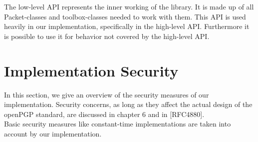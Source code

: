 The low-level API represents the inner working of the library. It is made up of all Packet-classes and toolbox-classes needed to work with them. This API is used heavily in our implementation, specifically in the high-level API. Furthermore it is possible to use it for behavior not covered by the high-level API.





%
%
%
%
%
%

\section{Implementation Security}
In this section, we give an overview of the security measures of our implementation. 
Security concerns, as long as they affect the actual design of the openPGP standard, are discussed in chapter 6 and in [RFC4880].  \\

Basic security measures like constant-time implementations are taken into account by our implementation.  \\

